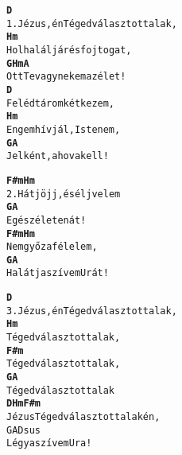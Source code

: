 \begin{minipage}{\textwidth}
\begin{multicols}{2}
\begin{minipage}{\textwidth}
\begin{alltt}
\textbf{   D}
1. Jézus, én Téged választottalak,
\textbf{    Hm}
   Hol halál jár és fojtogat,
\textbf{   G                Hm  A}
   Ott Te vagy nekem az élet!
\textbf{   D}
   Feléd tárom két kezem,
\textbf{   Hm}
   Engem hívjál, Istenem,
\textbf{    G             A}
   Jelként, ahova kell!
\end{alltt}
\vspace{0.0cm}
\versszakspacing
\end{minipage}
\begin{minipage}{\textwidth}
\begin{alltt}
\textbf{    F#m      Hm}
2. Hát jöjj, és élj velem
\textbf{   G            A}
   Egész életen át!
\textbf{    F#m  Hm}
   Nem győz a félelem,
\textbf{    G           A}
   Ha látja szívem Urát!
\end{alltt}
\vspace{0.0cm}
\versszakspacing
\end{minipage}
\begin{minipage}{\textwidth}
\begin{alltt}
\textbf{    D}
3. Jézus, én Téged választottalak,
\textbf{    Hm}
   Téged választottalak,
\textbf{    F#m}
   Téged választottalak,
\textbf{    G                A}
   Téged választottalak
\textbf{    D     Hm          F#m}
   Jézus Téged választottalak én,
    G       A    Dsus
   Légy a szívem Ura!
\end{alltt}
\vspace{0.0cm}
\versszakspacing
\end{minipage}
\vspace{0.2cm}
\end{multicols}

\end{minipage}
~\vspace{1.0cm}
\newline
